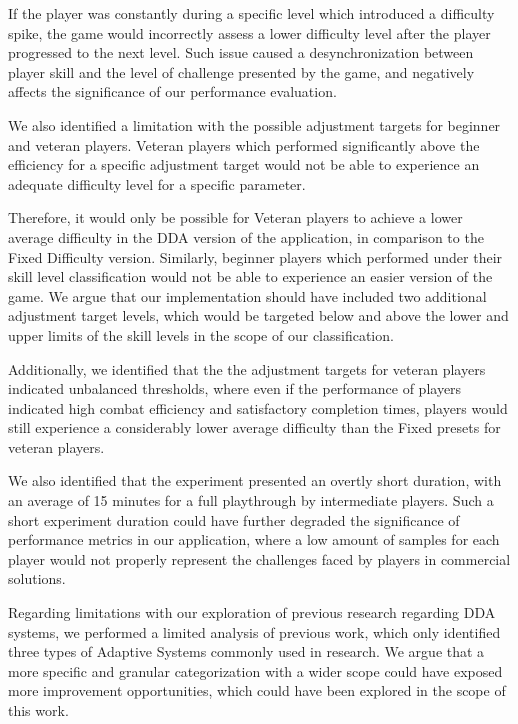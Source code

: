 If the player was constantly during a specific level which introduced a difficulty spike, the game would incorrectly assess a lower difficulty level after the player progressed to the next level. Such issue caused a desynchronization between player skill and the level of challenge presented by the game, and negatively affects the significance of our performance evaluation.

We also identified a limitation with the possible adjustment targets for beginner and veteran players. Veteran players which performed significantly above the efficiency for a specific adjustment target would not be able to experience an adequate difficulty level for a specific parameter.

Therefore, it would only be possible for Veteran players to achieve a lower average difficulty in the DDA version of the application, in comparison to the Fixed Difficulty version. Similarly, beginner players which performed under their skill level classification would not be able to experience an easier version of the game. We argue that our implementation should have included two additional adjustment target levels, which would be targeted below and above the lower and upper limits of the skill levels in the scope of our classification.

Additionally, we identified that the the adjustment targets for veteran players indicated unbalanced thresholds, where even if the performance of players indicated high combat efficiency and satisfactory completion times, players would still experience a considerably lower average difficulty than the Fixed presets for veteran players.

We also identified that the experiment presented an overtly short duration, with an average of 15 minutes for a full playthrough by intermediate players. Such a short experiment duration could have further degraded the significance of performance metrics in our application, where a low amount of samples for each player would not properly represent the challenges faced by players in commercial solutions.

Regarding limitations with our exploration of previous research regarding DDA systems, we performed a limited analysis of previous work, which only identified three types of Adaptive Systems commonly used in research. We argue that a more specific and granular categorization with a wider scope could have exposed more improvement opportunities, which could have been explored in the scope of this work.

